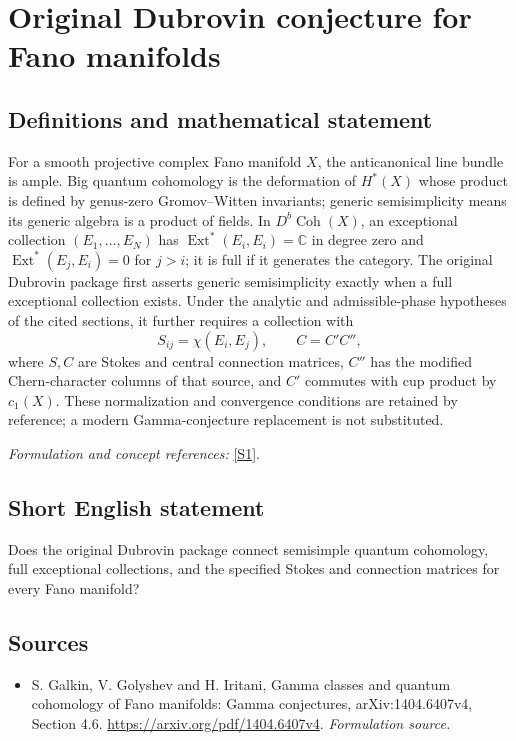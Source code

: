 \documentclass[11pt]{article}
\begin{document}
\section*{\texorpdfstring{Original Dubrovin conjecture for Fano manifolds}{Original Dubrovin conjecture for Fano manifolds}}\label{316}
\subsection{Definitions and mathematical statement}
For a smooth projective complex Fano manifold $X$, the anticanonical line bundle is ample. Big quantum cohomology is the deformation of $H^*(X)$ whose product is defined by genus-zero Gromov--Witten invariants; generic semisimplicity means its generic algebra is a product of fields. In $D^b\operatorname{Coh}(X)$, an exceptional collection $(E_1,\ldots,E_N)$ has $\operatorname{Ext}^*(E_i,E_i)={\mathbb{C}}$ in degree zero and $\operatorname{Ext}^*(E_j,E_i)=0$ for $j>i$; it is full if it generates the category. The original Dubrovin package first asserts generic semisimplicity exactly when a full exceptional collection exists. Under the analytic and admissible-phase hypotheses of the cited sections, it further requires a collection with
\[
 S_{ij}=\chi(E_i,E_j),\qquad C=C'C'',
\]
where $S,C$ are Stokes and central connection matrices, $C''$ has the modified Chern-character columns of that source, and $C'$ commutes with cup product by $c_1(X)$. These normalization and convergence conditions are retained by reference; a modern Gamma-conjecture replacement is not substituted.
\par\smallskip\textit{Formulation and concept references:} \href{https://arxiv.org/pdf/1404.6407v4}{[S1]}.

\subsection{Short English statement}
Does the original Dubrovin package connect semisimple quantum cohomology, full exceptional collections, and the specified Stokes and connection matrices for every Fano manifold?
\subsection{Sources}
\begin{itemize}
\item[S1]S. Galkin, V. Golyshev and H. Iritani, Gamma classes and quantum cohomology of Fano manifolds: Gamma conjectures, arXiv:1404.6407v4, Section 4.6.
\url{https://arxiv.org/pdf/1404.6407v4}.
\textit{Formulation source.}
\end{itemize}
\end{document}
